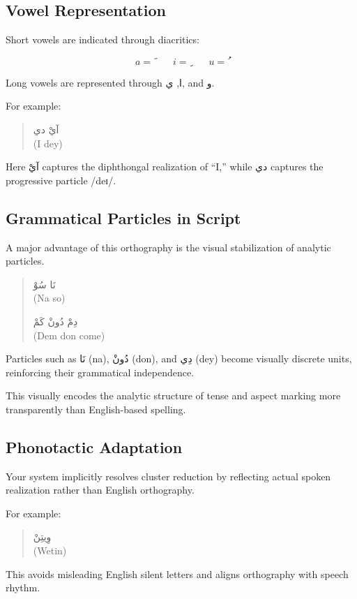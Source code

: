 \documentclass[12pt]{article}
\begin{document}
\subsection{Vowel Representation}

Short vowels are indicated through diacritics:

\[
a = َ \qquad
i = ِ \qquad
u = ُ
\]

Long vowels are represented through ا, ي, and و.

For example:

\begin{quote}
آيْ دي \\
(I dey)
\end{quote}

Here آيْ captures the diphthongal realization of “I,” while دي captures the progressive particle /deɪ/.

\subsection{Grammatical Particles in Script}

A major advantage of this orthography is the visual stabilization of analytic particles.

\begin{quote}
نَا سُوْ \\
(Na so)

دِمْ دُونْ كَمْ \\
(Dem don come)
\end{quote}

Particles such as نَا (na), دُونْ (don), and دِي (dey) become visually discrete units, reinforcing their grammatical independence.

This visually encodes the analytic structure of tense and aspect marking more transparently than English-based spelling.

\subsection{Phonotactic Adaptation}

Your system implicitly resolves cluster reduction by reflecting actual spoken realization rather than English orthography.

For example:

\begin{quote}
وِيتِنْ \\
(Wetin)
\end{quote}

This avoids misleading English silent letters and aligns orthography with speech rhythm.
\end{document}
